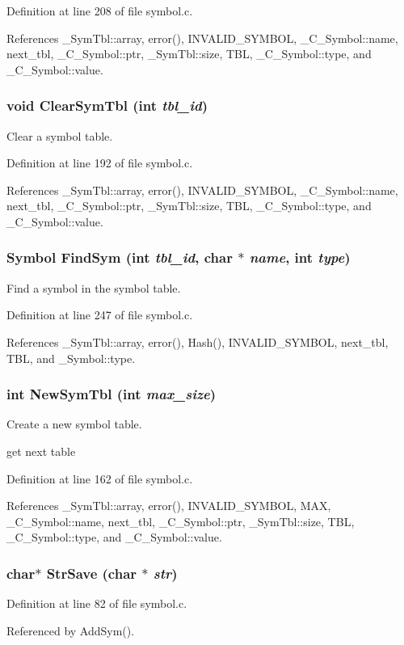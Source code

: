 Definition at line 208 of file symbol.c.

References \_\-Sym\-Tbl::array, error(), INVALID\_\-SYMBOL, \_\-C\_\-Symbol::name, next\_\-tbl, \_\-C\_\-Symbol::ptr, \_\-Sym\-Tbl::size, TBL, \_\-C\_\-Symbol::type, and \_\-C\_\-Symbol::value.
\subsubsection{\setlength{\rightskip}{0pt plus 5cm}void Clear\-Sym\-Tbl (int {\em tbl\_\-id})}\label{symbol_8h_ece567fd9e5204d5c8998cc4f3c266ca}


Clear a symbol table. 

Definition at line 192 of file symbol.c.

References \_\-Sym\-Tbl::array, error(), INVALID\_\-SYMBOL, \_\-C\_\-Symbol::name, next\_\-tbl, \_\-C\_\-Symbol::ptr, \_\-Sym\-Tbl::size, TBL, \_\-C\_\-Symbol::type, and \_\-C\_\-Symbol::value.
\subsubsection{\setlength{\rightskip}{0pt plus 5cm}\bf{Symbol} Find\-Sym (int {\em tbl\_\-id}, char $\ast$ {\em name}, int {\em type})}\label{symbol_8h_4e49bf067c9691ac9d2fd412e05d8ff2}


Find a symbol in the symbol table. 

Definition at line 247 of file symbol.c.

References \_\-Sym\-Tbl::array, error(), Hash(), INVALID\_\-SYMBOL, next\_\-tbl, TBL, and \_\-Symbol::type.
\subsubsection{\setlength{\rightskip}{0pt plus 5cm}int New\-Sym\-Tbl (int {\em max\_\-size})}\label{symbol_8h_b7f269b7f4db6db301dfd0b6a3e68bef}


Create a new symbol table. 

get next table 

Definition at line 162 of file symbol.c.

References \_\-Sym\-Tbl::array, error(), INVALID\_\-SYMBOL, MAX, \_\-C\_\-Symbol::name, next\_\-tbl, \_\-C\_\-Symbol::ptr, \_\-Sym\-Tbl::size, TBL, \_\-C\_\-Symbol::type, and \_\-C\_\-Symbol::value.
\subsubsection{\setlength{\rightskip}{0pt plus 5cm}char$\ast$ Str\-Save (char $\ast$ {\em str})}\label{symbol_8h_2833fbeb3ea9ff23f6bf38a3ae4cb00e}




Definition at line 82 of file symbol.c.

Referenced by Add\-Sym().